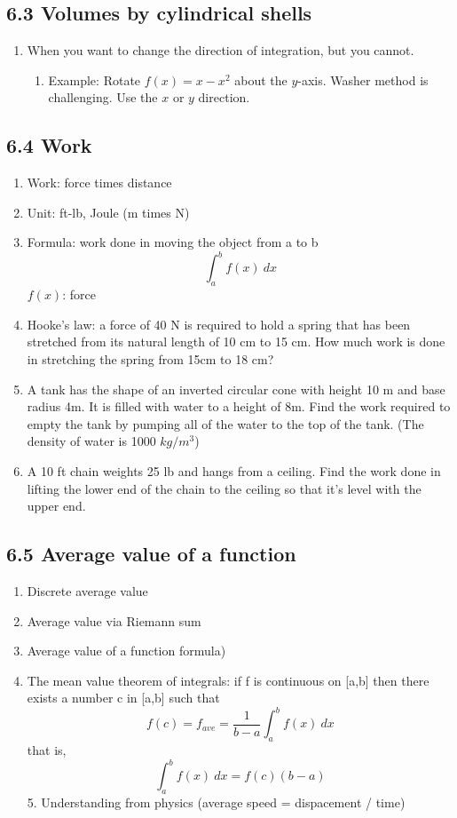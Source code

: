 \documentclass{article}
\begin{document}
\subsection{6.3 Volumes by cylindrical shells}

\begin{enumerate}
\item When you want to change the direction of integration, but you cannot.
\begin{enumerate}
\item Example: Rotate $f(x)=x-x^2$ about the $y$-axis. Washer method is challenging. Use the $x$ or $y$ direction. 
\end{enumerate}

\end{enumerate}


\subsection{6.4 Work}
\begin{enumerate}
\item Work: force times distance
\item Unit: ft-lb, Joule (m times N)
\item Formula: work done in moving the object from a to b
$$
\int_a^b f(x)~dx
$$
$f(x)$: force
\item Hooke's law: a force of 40 N is required to hold a spring that has been stretched from its natural length of 10 cm to 15 cm. How much work is done in stretching the spring from 15cm to 18 cm? 
\item A tank has the shape of an inverted circular cone with height 10 m and base radius 4m. It is filled with water to a height of 8m. Find the work required to empty the tank by pumping all of the water to the top of the tank.  (The density of water is 1000 $kg/m^3$)
\item A 10 ft chain weights 25 lb and hangs from a ceiling. Find the work done in lifting the lower end of the chain to the ceiling so that it's level with the upper end.
\end{enumerate}


\subsection{6.5 Average value of a function}
\begin{enumerate}
\item Discrete average value
\item Average value via Riemann sum
\item Average value of a function formula)
\item The mean value theorem of integrals: if f is continuous on [a,b] then there exists a number c in [a,b] such that 
$$
f(c) = f_{ave} = \frac{1}{b-a}\int_a^bf(x)~dx
$$
that is,
$$
\int_a^bf(x)~dx = f(c)(b-a)
$$
5. Understanding from physics (average speed = dispacement / time)
\end{enumerate}
\end{document}
